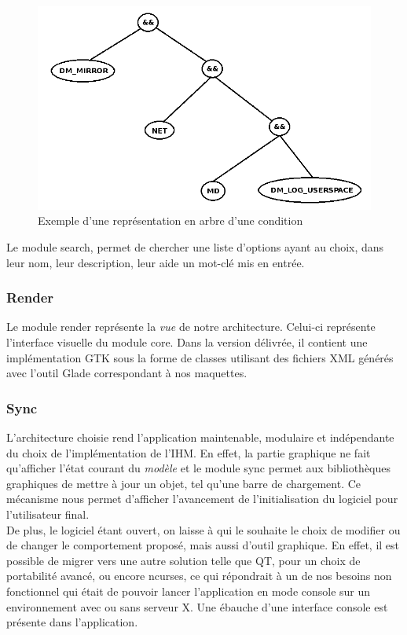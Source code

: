 \documentclass[17pts]{report}
\begin{document}
\begin{figure}[H]
    \includegraphics[scale=0.5]{illustrations/condition_tree.png}
    \centering
    \caption{Exemple d'une représentation en arbre d'une condition}
    \label{fig:condTree}
\end{figure}

Le module search, permet de chercher une liste d'options ayant au choix, dans
leur nom, leur description, leur aide un mot-clé mis en entrée.

\subsubsection{Render}
\label{ssub:Render}
Le module render représente la \textit{vue} de notre architecture.  Celui-ci
représente l'interface visuelle du module core.  Dans la version délivrée, il
contient une implémentation GTK sous la forme de classes utilisant des fichiers
XML générés avec l'outil Glade correspondant à nos maquettes.

\subsubsection{Sync}
\label{ssub:Sync}
L'architecture choisie rend l'application maintenable, modulaire et
indépendante du choix de l'implémentation de l'IHM. En effet, la partie
graphique ne fait qu'afficher l'état courant du \textit{modèle} et le module
sync permet aux bibliothèques graphiques de mettre à jour un objet, tel qu'une
barre de chargement. Ce mécanisme nous permet d'afficher l'avancement de
l'initialisation du logiciel pour l'utilisateur final.  \\

De plus, le logiciel étant ouvert, on laisse à qui le souhaite le choix de
modifier ou de changer le comportement proposé, mais aussi d'outil graphique.
En effet, il est possible de migrer vers une autre solution telle que QT, pour
un choix de portabilité avancé,  ou encore ncurses, ce qui répondrait à un de
nos besoins non fonctionnel qui était de pouvoir lancer l'application en mode
console sur un environnement avec ou sans serveur X.
Une ébauche d'une interface console est présente dans l'application. \\
\end{document}

